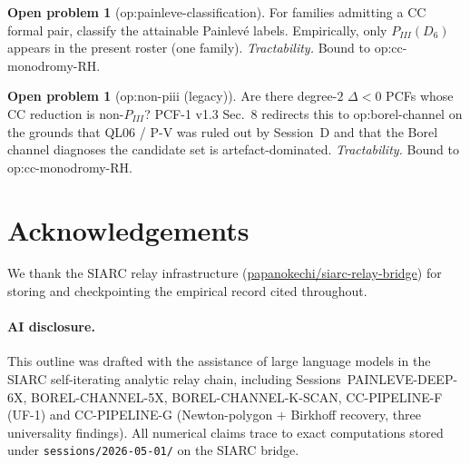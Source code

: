 \documentclass[11pt,reqno]{amsart}
\theoremstyle{plain}
\theoremstyle{definition}
\newtheorem{problem}[theorem]{Open problem}
\theoremstyle{remark}
\newcommand{\CC}{\mathrm{CC}}
\begin{document}
\begin{problem}[\textsf{op:painleve-classification}]
For families admitting a $\CC$ formal pair, classify the
attainable Painlev\'e labels. Empirically, only $P_{III}(D_6)$
appears in the present roster (one family).
\emph{Tractability.} Bound to \textsf{op:cc-monodromy-RH}.
\end{problem}

\begin{problem}[\textsf{op:non-piii} (legacy)]
Are there degree-$2$ $\Delta < 0$ PCFs whose $\CC$ reduction
is non-$P_{III}$? PCF-1 v1.3 Sec.~8 redirects this
to \textsf{op:borel-channel} on the grounds that QL06 / P-V
was ruled out by Session~D and that
the Borel channel diagnoses the candidate set is
artefact-dominated.
\emph{Tractability.} Bound to \textsf{op:cc-monodromy-RH}.
\end{problem}

\section*{Acknowledgements}

We thank the SIARC relay infrastructure
(\href{https://github.com/papanokechi/siarc-relay-bridge}%
{papanokechi/siarc-relay-bridge}) for storing and
checkpointing the empirical record cited throughout.

\paragraph{AI disclosure.} This outline was drafted with the
assistance of large language models in the SIARC
self-iterating analytic relay chain, including
Sessions~PAINLEVE-DEEP-6X, BOREL-CHANNEL-5X,
BOREL-CHANNEL-K-SCAN, CC-PIPELINE-F (UF-1) and CC-PIPELINE-G
(Newton-polygon $+$ Birkhoff recovery, three universality
findings). All numerical claims trace to exact computations
stored under \texttt{sessions/2026-05-01/} on the SIARC
bridge.



\end{document}
